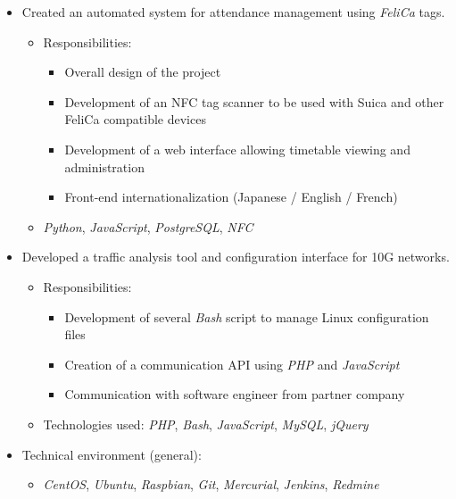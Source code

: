 \documentclass[11pt,a4paper,sans]{moderncv}
\providecommand{\techno}{}
\renewcommand{\techno}{\emph}
\providecommand{\lang}{}
\renewcommand{\lang}{\emph}
\begin{document}
{\begin{itemize}
\begin{itemize}
\begin{itemize}
            \end{itemize}
        \item Technologies used: \lang{C++}, \techno{Boost}
    \end{itemize}
\item Created an automated system for attendance management using \techno{FeliCa} tags.
    \begin{itemize}%
        \item Responsibilities:
            \begin{itemize}%
                \item Overall design of the project
                \item Development of an NFC tag scanner to be used with Suica and other FeliCa compatible devices
                \item Development of a web interface allowing timetable viewing and administration
                \item Front-end internationalization (Japanese / English / French)
            \end{itemize}
        \item \lang{Python}, \lang{JavaScript}, \techno{PostgreSQL}, \techno{NFC}
    \end{itemize}
\ifdefined\detailed%
\item Developed a traffic analysis tool and configuration interface for 10G networks.
    \begin{itemize}%
        \item Responsibilities:
            \begin{itemize}%
                \item Development of several \lang{Bash} script to manage Linux configuration files
                \item Creation of a communication API using \lang{PHP} and \lang{JavaScript}
                \item Communication with software engineer from partner company
            \end{itemize}
        \item Technologies used: \lang{PHP}, \lang{Bash}, \lang{JavaScript}, \techno{MySQL}, \techno{jQuery}
    \end{itemize}
\fi
\item Technical environment (general):
    \begin{itemize}%
        \item \techno{CentOS}, \techno{Ubuntu}, \techno{Raspbian}, \techno{Git}, \techno{Mercurial}, \techno{Jenkins}, \techno{Redmine}
    \end{itemize}
\end{itemize}
}
\end{document}
